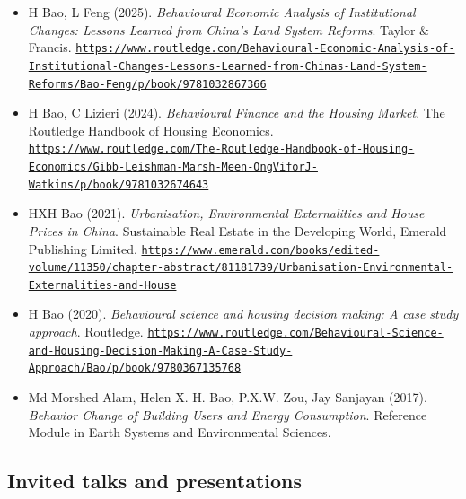\documentclass[11pt,a4paper]{article}
\providecommand{\tightlist}{%
  \setlength{\itemsep}{1pt}\setlength{\parskip}{0pt}}
\begin{document}
\begin{itemize}
\tightlist
\item
  H Bao, L Feng (2025). \emph{Behavioural Economic Analysis of
  Institutional Changes: Lessons Learned from China's Land System
  Reforms}. Taylor \& Francis.
  \href{https://www.routledge.com/Behavioural-Economic-Analysis-of-Institutional-Changes-Lessons-Learned-from-Chinas-Land-System-Reforms/Bao-Feng/p/book/9781032867366}{\nolinkurl{https://www.routledge.com/Behavioural-Economic-Analysis-of-Institutional-Changes-Lessons-Learned-from-Chinas-Land-System-Reforms/Bao-Feng/p/book/9781032867366}}
\item
  H Bao, C Lizieri (2024). \emph{Behavioural Finance and the Housing
  Market}. The Routledge Handbook of Housing Economics.
  \href{https://www.routledge.com/The-Routledge-Handbook-of-Housing-Economics/Gibb-Leishman-Marsh-Meen-OngViforJ-Watkins/p/book/9781032674643}{\nolinkurl{https://www.routledge.com/The-Routledge-Handbook-of-Housing-Economics/Gibb-Leishman-Marsh-Meen-OngViforJ-Watkins/p/book/9781032674643}}
\item
  HXH Bao (2021). \emph{Urbanisation, Environmental Externalities and
  House Prices in China}. Sustainable Real Estate in the Developing
  World, Emerald Publishing Limited.
  \href{https://www.emerald.com/books/edited-volume/11350/chapter-abstract/81181739/Urbanisation-Environmental-Externalities-and-House}{\nolinkurl{https://www.emerald.com/books/edited-volume/11350/chapter-abstract/81181739/Urbanisation-Environmental-Externalities-and-House}}
\item
  H Bao (2020). \emph{Behavioural science and housing decision making: A
  case study approach}. Routledge.
  \href{https://www.routledge.com/Behavioural-Science-and-Housing-Decision-Making-A-Case-Study-Approach/Bao/p/book/9780367135768}{\nolinkurl{https://www.routledge.com/Behavioural-Science-and-Housing-Decision-Making-A-Case-Study-Approach/Bao/p/book/9780367135768}}
\item
  Md Morshed Alam, Helen X. H. Bao, P.X.W. Zou, Jay Sanjayan (2017).
  \emph{Behavior Change of Building Users and Energy Consumption}.
  Reference Module in Earth Systems and Environmental Sciences.
\end{itemize}

\subsection{Invited talks and
presentations}\label{invited-talks-and-presentations}
\end{document}
